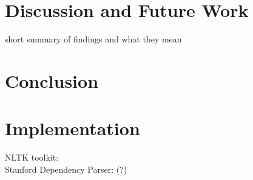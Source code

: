 \documentclass{report}
\theoremstyle{definition}
\theoremstyle{plain}
\begin{document}
\chapter{Discussion and Future Work}

short summary of findings and what they mean



%
%
%




%
%

\chapter{Conclusion}





%
%

\appendix
\chapter{Implementation}
\label{appendix:impl}

NLTK toolkit: \cite{bird2009natural}\\
Stanford Dependency Parser: \cite{de2008stanford}(?)

%
%
%
\end{document}
